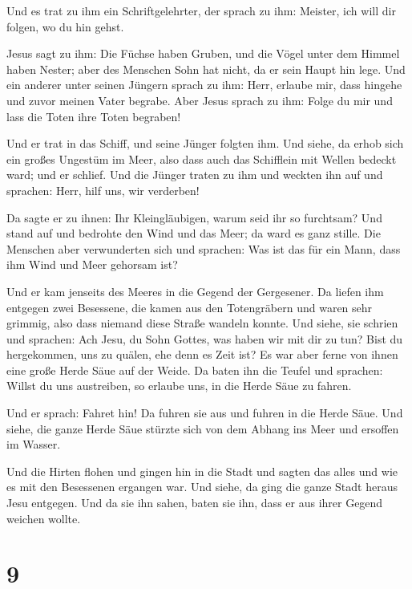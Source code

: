  Und es trat zu ihm ein Schriftgelehrter, der sprach zu
ihm: Meister, ich will dir folgen, wo du hin gehst.

 Jesus sagt zu ihm: Die Füchse haben Gruben, und die
Vögel unter dem Himmel haben Nester; aber des Menschen Sohn hat nicht,
da er sein Haupt hin lege.  Und ein anderer unter seinen
Jüngern sprach zu ihm: Herr, erlaube mir, dass hingehe und zuvor meinen
Vater begrabe.  Aber Jesus sprach zu ihm: Folge du mir
und lass die Toten ihre Toten begraben!

 Und er trat in das Schiff, und seine Jünger folgten ihm.
 Und siehe, da erhob sich ein großes Ungestüm im Meer,
also dass auch das Schifflein mit Wellen bedeckt ward; und er schlief.
 Und die Jünger traten zu ihm und weckten ihn auf und
sprachen: Herr, hilf uns, wir verderben!

 Da sagte er zu ihnen: Ihr Kleingläubigen, warum seid ihr
so furchtsam? Und stand auf und bedrohte den Wind und das Meer; da ward
es ganz stille.  Die Menschen aber verwunderten sich und
sprachen: Was ist das für ein Mann, dass ihm Wind und Meer gehorsam ist?

 Und er kam jenseits des Meeres in die Gegend der
Gergesener. Da liefen ihm entgegen zwei Besessene, die kamen aus den
Totengräbern und waren sehr grimmig, also dass niemand diese Straße
wandeln konnte.  Und siehe, sie schrien und sprachen: Ach
Jesu, du Sohn Gottes, was haben wir mit dir zu tun? Bist du hergekommen,
uns zu quälen, ehe denn es Zeit ist?  Es war aber ferne
von ihnen eine große Herde Säue auf der Weide.  Da baten
ihn die Teufel und sprachen: Willst du uns austreiben, so erlaube uns,
in die Herde Säue zu fahren.

 Und er sprach: Fahret hin! Da fuhren sie aus und fuhren
in die Herde Säue. Und siehe, die ganze Herde Säue stürzte sich von dem
Abhang ins Meer und ersoffen im Wasser.

 Und die Hirten flohen und gingen hin in die Stadt und
sagten das alles und wie es mit den Besessenen ergangen war.
 Und siehe, da ging die ganze Stadt heraus Jesu entgegen.
Und da sie ihn sahen, baten sie ihn, dass er aus ihrer Gegend weichen
wollte.

\hypertarget{section-8}{%
\section{9}\label{section-8}}

